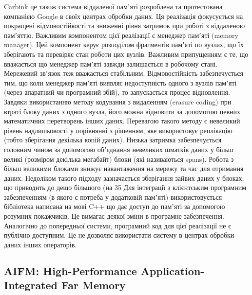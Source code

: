 \documentclass[14pt]{article}
\begin{document}
Carbink це також система віддаленої памʼяті розроблена та протестована компанією Google в своїх центрах обробки даних. Ця реалізація фокусується на покращені відмовостійкості та зниженні рівня затримок при роботі з віддаленою памʼяттю.
Важливим компонентом цієї реалізації є менеджер памʼяті (memory manager). Цей компонент керує розподілом фрагментів памʼяті по вузлах, що їх зберігають та перевіряє стан роботи цих вузлів. Важливим припущенням є те, що вважається що менеджер памʼяті завжди залишається в робочому стані. Мережевий звʼязок теж вважається стабільним.
Відмовостійкість забезпечується тим, що коли менеджер памʼяті виявляє недоступність одного з вузлів памʼяті (через апаратний чи програмний збій), то запускається процес відновлення. Завдяки використанню методу кодування з видаленням (erasure coding) при втраті блоку даних з одного вузла, його можна відновити за допомогою певних математичних перетворень інших даних. Перевагою такого методу є невеликий рівень надлишковості у порівнянні з рішенням, яке використовує реплікацію (тобто зберігання декілька копій даних).
Низька затримка забезпечується головним чином за допомогою обʼєднання невеликих шматків даних у більш великі (розміром декілька мегабайт) блоки (які називаються spans). Робота з більш великими блоками знижує навантаження на мережу та час для отримання даних. Недоліком такого підходу зазначається зберігання зайвих даних у блоках, що приводить до дещо більшого (на 35%
Для інтеграції з клієнтським програмним забезпеченням (в якого є потреба у додатковій памʼяті) використовується бібліотека написана на мові C++ що дає доступ до памʼяті за допомогою розумних покажчиків. Це вимагає деякої зміни в програмне забезпечення.
Аналогічно до попередньої системи, програмний код для цієї реалізації не є публічно доступним. Це не дозволяє використати систему в центрах обробки даних інших операторів.

\subsection{AIFM: High-Performance Application-Integrated Far Memory}
\end{document}
